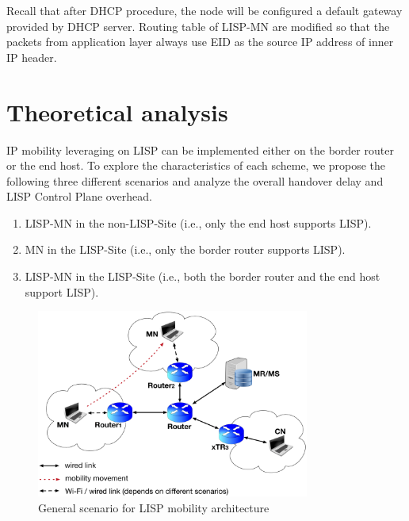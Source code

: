 Recall that after DHCP procedure, the node will be configured a default gateway provided by DHCP server. Routing table of LISP-MN are modified so that the packets from application layer always use EID as the source IP address of inner IP header.



\section{Theoretical analysis}
\label{sec:ns3_analysis}
IP mobility leveraging on LISP can be implemented either on the border router or the end host. To explore the characteristics of each scheme, we propose the following three different scenarios and analyze the overall handover delay and LISP Control Plane overhead. 
\begin{enumerate}[noitemsep,topsep=0pt]
	\item LISP-MN in the non-LISP-Site (i.e., only the end host supports LISP). 
	\item MN in the LISP-Site (i.e., only the border router supports LISP). 
	\item LISP-MN in the LISP-Site (i.e., both the border router and the end host support LISP). 
\end{enumerate}	
\begin{figure}[!t]
	\centering
	\includegraphics[width=0.8\textwidth]{Pics/LISP_mobility_archi}
	\caption{General scenario for LISP mobility architecture}
	\label{sim_archi}
\end{figure}

